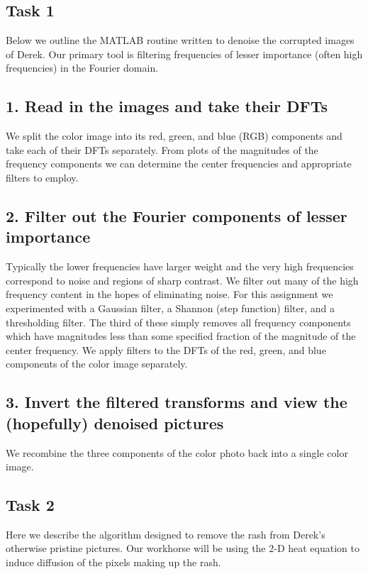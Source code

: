 \documentclass[fleqn,10pt]{../SelfArx} %
\begin{document}
\subsection{Task 1}
\label{sec:algorithms_implementation_and_development_task1}
Below we outline the MATLAB routine written to denoise the corrupted images of Derek. Our primary tool is filtering frequencies of lesser importance (often high frequencies) in the Fourier domain.

\subsection*{1. Read in the images and take their DFTs}
We split the color image into its red, green, and blue (RGB) components and take each of their DFTs separately. From plots of the magnitudes of the frequency components we can determine the center frequencies and appropriate filters to employ.

\subsection*{2. Filter out the Fourier components of lesser importance}
Typically the lower frequencies have larger weight and the very high frequencies correspond to noise and regions of sharp contrast. We filter out many of the high frequency content in the hopes of eliminating noise. For this assignment we experimented with a Gaussian filter, a Shannon (step function) filter, and a thresholding filter. The third of these simply removes all frequency components which have magnitudes less than some specified fraction of the magnitude of the center frequency. We apply filters to the DFTs of the red, green, and blue components of the color image separately.

\subsection*{3. Invert the filtered transforms and view the (hopefully) denoised pictures}
We recombine the three components of the color photo back into a single color image.

\subsection{Task 2}
\label{sec:algorithms_implementation_and_development_task2}
Here we describe the algorithm designed to remove the rash from Derek's otherwise pristine pictures. Our workhorse will be using the 2-D heat equation to induce diffusion of the pixels making up the rash.
\end{document}
